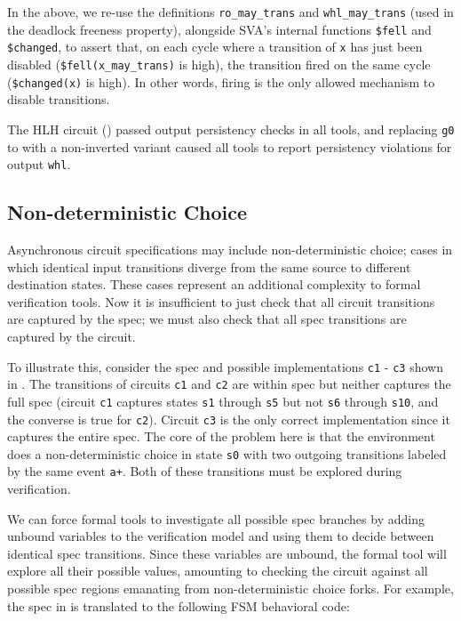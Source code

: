 In the above, we re-use the definitions \texttt{ro\_may\_trans} and
\texttt{whl\_may\_trans} (used in the deadlock freeness property), alongside
SVA's internal functions \texttt{\$fell} and \texttt{\$changed}, to assert
that, on each cycle where a transition of \texttt{x} has just been disabled
(\texttt{\$fell(x\_may\_trans)} is high), the transition fired on the same
cycle (\texttt{\$changed(x)} is high). In other words, firing is the only
allowed mechanism to disable transitions.

The HLH circuit () passed output persistency checks in
all tools, and replacing \texttt{g0} to with a non-inverted variant caused
all tools to report persistency violations for output \texttt{whl}.



\newpage

\subsection{Non-deterministic Choice}
\label{subsec:nondet}

Asynchronous circuit specifications may include non-deterministic choice;
cases in which identical input transitions diverge from the same source to
different destination states. These cases represent an additional complexity
to formal verification tools. Now it is insufficient to just check that all
circuit transitions are captured by the spec; we must also check that all spec
transitions are captured by the circuit.

To illustrate this, consider the spec and possible implementations \texttt{c1}
- \texttt{c3} shown in . The transitions of circuits
\texttt{c1} and \texttt{c2} are within spec but neither captures the full spec
(circuit \texttt{c1} captures states \texttt{s1} through \texttt{s5} but not
\texttt{s6} through \texttt{s10}, and the converse is true for \texttt{c2}).
Circuit \texttt{c3} is the only correct implementation since it captures the
entire spec. The core of the problem here is that the environment does a
non-deterministic choice in state \texttt{s0} with two outgoing transitions
labeled by the same event \texttt{a+}. Both of these transitions must be
explored during verification.

We can force formal tools to investigate all possible spec branches by adding
unbound variables to the verification model and using them to decide between
identical spec transitions. Since these variables are unbound, the formal tool
will explore all their possible values, amounting to checking the circuit
against all possible spec regions emanating from non-deterministic choice
forks. For example, the spec in  is translated to the
following FSM behavioral code:

